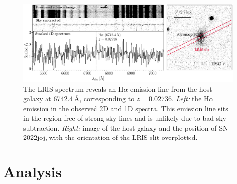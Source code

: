 \documentclass[twocolumn]{aastex631}
\newcommand{\sn}{SN\,2022joj}
\begin{document}
\begin{CJK*}{UTF8}{gbsn}
\begin{figure}
    \label{fig:spec_seq}
\end{figure}
\begin{figure}
    \centering
    \includegraphics[width=\linewidth]{host_spec.pdf}
    \caption{The LRIS spectrum reveals an H$\alpha$ emission line from the host galaxy at 6742.4\,\AA, corresponding to $z=0.02736$. \textit{Left:} the H$\alpha$ emission in the observed 2D and 1D spectra. This emission line sits in the region free of strong sky lines and is unlikely due to bad sky subtraction.
    \textit{Right:} image of the host galaxy and the position of \sn, with the orientation of the LRIS slit overplotted.    
    }
    \label{fig:host_spec}
\end{figure}


\section{Analysis} \label{sec:analysis}

\end{CJK*}
\end{document}
